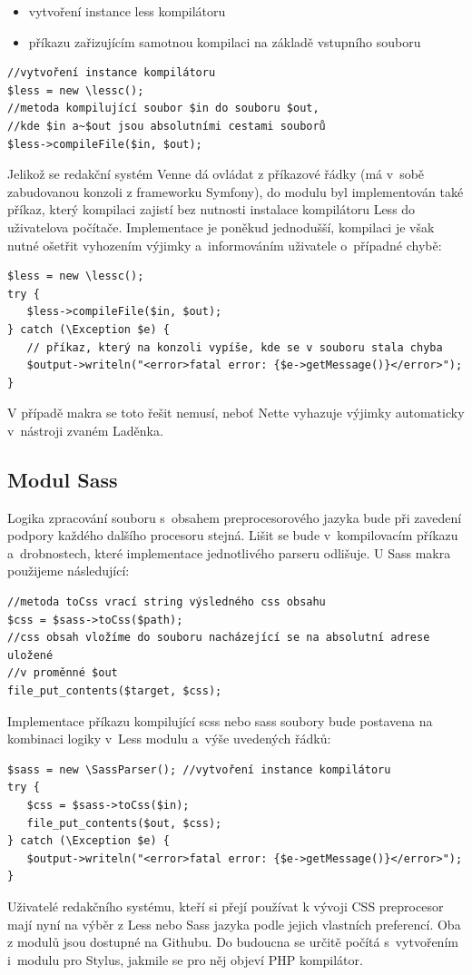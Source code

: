\documentclass[thesis=B,czech]{FITthesis}[2012/06/26]
\begin{document}
\begin{itemize}
 \item vytvoření instance less kompilátoru
 \item příkazu zařizujícím samotnou kompilaci na základě vstupního souboru
\end{itemize}
\scriptsize
\begin{verbatim}
//vytvoření instance kompilátoru
$less = new \lessc(); 
//metoda kompilující soubor $in do souboru $out, 
//kde $in a~$out jsou absolutními cestami souborů
$less->compileFile($in, $out); 
\end{verbatim}
\normalsize
Jelikož se redakční systém Venne dá ovládat z příkazové řádky (má v~sobě zabudovanou konzoli z frameworku Symfony), do modulu byl implementován také příkaz, který kompilaci zajistí bez nutnosti instalace kompilátoru Less do uživatelova počítače. Implementace je poněkud jednodušší, kompilaci je však nutné ošetřit vyhozením výjimky a~informováním uživatele o~případné chybě:
\scriptsize
\begin{verbatim}
$less = new \lessc();
try {
   $less->compileFile($in, $out);
} catch (\Exception $e) {
   // příkaz, který na konzoli vypíše, kde se v souboru stala chyba
   $output->writeln("<error>fatal error: {$e->getMessage()}</error>"); 
}
\end{verbatim}
\normalsize
V případě makra se toto řešit nemusí, neboť Nette vyhazuje výjimky automaticky v~nástroji zvaném Laděnka.



\subsection{Modul Sass}

Logika zpracování souboru s~obsahem preprocesorového jazyka bude při zavedení podpory každého dalšího procesoru stejná. Lišit se bude v~kompilovacím příkazu a~drobnostech, které implementace jednotlivého parseru odlišuje. U Sass makra použijeme následující:	

\scriptsize
\begin{verbatim}
//metoda toCss vrací string výsledného css obsahu
$css = $sass->toCss($path); 
//css obsah vložíme do souboru nacházející se na absolutní adrese uložené 
//v proměnné $out
file_put_contents($target, $css);  
\end{verbatim}
\normalsize
Implementace příkazu kompilující scss nebo sass soubory bude postavena na kombinaci logiky v~Less modulu a~výše uvedených řádků:
\scriptsize
\begin{verbatim}
$sass = new \SassParser(); //vytvoření instance kompilátoru
try {
   $css = $sass->toCss($in); 	
   file_put_contents($out, $css);
} catch (\Exception $e) {
   $output->writeln("<error>fatal error: {$e->getMessage()}</error>");
}
\end{verbatim}
\normalsize
Uživatelé redakčního systému, kteří si přejí používat k vývoji CSS preprocesor mají nyní na výběr z Less nebo Sass jazyka podle jejich vlastních preferencí. Oba z modulů jsou dostupné na Githubu. Do budoucna se určitě počítá s~vytvořením i~modulu pro Stylus, jakmile se pro něj objeví PHP kompilátor.
\end{document}

